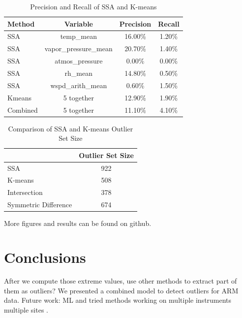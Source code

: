 \documentclass[letterpaper, 10 pt, conference]{ieeeconf}  %
\begin{document}
\begin{table}[ht]
\caption{Precision and Recall of SSA and K-means}
\label{tab:pr}
\centering
\begin{tabular}{|l|c|c|c|}
\hline
Method & Variable & Precision & Recall\\
\hline
SSA & temp\_mean & 16.00\% & 1.20\%\\
SSA & vapor\_pressure\_mean & 20.70\% & 1.40\%\\
SSA & atmos\_pressure & 0.00\% & 0.00\%\\
SSA & rh\_mean & 14.80\% & 0.50\%\\
SSA & wspd\_arith\_mean & 0.60\% & 1.50\%\\
Kmeans & 5 together & 12.90\% & 1.90\%\\
Combined & 5 together & 11.10\% & 4.10\%\\
\hline
\end{tabular}
\end{table}

\begin{table}[ht]
\caption{Comparison of SSA and K-means Outlier Set Size}
\label{tab:comp}
\centering
\begin{tabular}{|l|c|}
\cline{2-2}
\multicolumn{1}{l|}{} & Outlier Set Size\\
\hline
SSA & 922\\
K-means & 508\\
Intersection & 378\\
Symmetric Difference & 674\\
\hline
\end{tabular}
\end{table}

More figures and results can be found on github. 

\section{Conclusions}
After we compute those extreme values, use other methods to extract part of them as outliers?
We presented a combined model to detect outliers for ARM data. Future work: 
ML and tried methods working on multiple instruments multiple sites \cite{phillips2015graph}.

\end{document}
